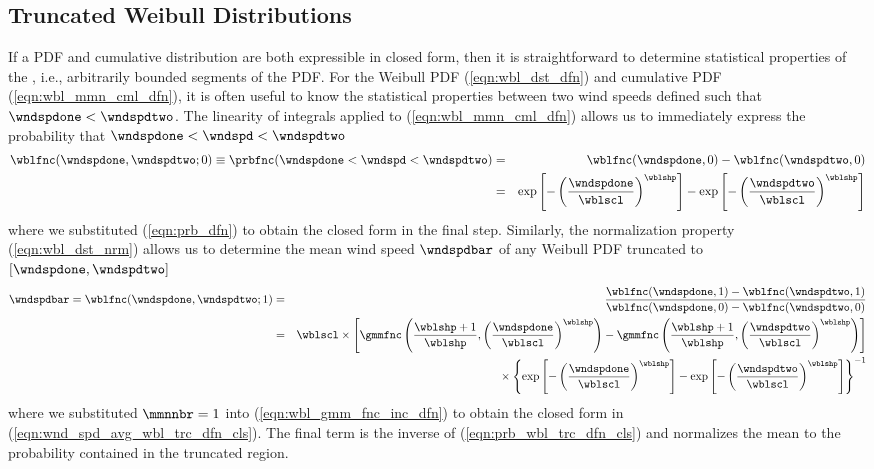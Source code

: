 \documentclass[12pt,twoside]{book}
\begin{document}
\subsection{Truncated Weibull Distributions}\label{sxn:wbl_trc}
If a PDF and cumulative distribution are both expressible in closed
form, then it is straightforward to determine statistical properties
of the , i.e., arbitrarily bounded segments of
the PDF. 
For the Weibull PDF (\ref{eqn:wbl_dst_dfn}) and cumulative PDF
(\ref{eqn:wbl_mmn_cml_dfn}), it is often useful to know the
statistical properties between two wind speeds defined such that
$\wndspdone < \wndspdtwo$. 
The linearity of integrals applied to (\ref{eqn:wbl_mmn_cml_dfn})
allows us to immediately express the probability that 
$\wndspdone < \wndspd < \wndspdtwo$
\begin{eqnarray}
\label{eqn:prb_wbl_trc_dfn}
\wblfnc(\wndspdone,\wndspdtwo;0) \equiv 
\prbfnc(\wndspdone < \wndspd < \wndspdtwo) 
& = & 
\wblfnc(\wndspdone,0) - \wblfnc(\wndspdtwo,0) \\
& = & 
\exp \left[- \left( \frac{\wndspdone}{\wblscl} \right)^{\wblshp} \right] -
\exp \left[- \left( \frac{\wndspdtwo}{\wblscl} \right)^{\wblshp} \right]
\label{eqn:prb_wbl_trc_dfn_cls}
\end{eqnarray}
where we substituted (\ref{eqn:prb_dfn}) to obtain the closed form in 
the final step.
Similarly, the normalization property (\ref{eqn:wbl_dst_nrm}) allows
us to determine the mean wind speed $\wndspdbar$ of any Weibull PDF
truncated to $[\wndspdone,\wndspdtwo]$ 
\begin{eqnarray}
\label{eqn:wnd_spd_avg_wbl_trc_dfn}
\wndspdbar = \wblfnc(\wndspdone,\wndspdtwo;1) 
& = & 
\frac{\wblfnc(\wndspdone,1) - \wblfnc(\wndspdtwo,1)}
{\wblfnc(\wndspdone,0) - \wblfnc(\wndspdtwo,0)} \\
& = & 
\wblscl \times 
\left[
\gmmfnc \left( \frac{\wblshp + 1}{\wblshp}, \left( \frac{\wndspdone}{\wblscl} \right)^{\wblshp} \right) 
-
\gmmfnc \left( \frac{\wblshp + 1}{\wblshp}, \left( \frac{\wndspdtwo}{\wblscl} \right)^{\wblshp} \right) 
\right]
\nonumber \\ & & {} %
\times
\left\{ \exp \left[- \left( \frac{\wndspdone}{\wblscl} \right)^{\wblshp} \right] -
\exp \left[- \left( \frac{\wndspdtwo}{\wblscl} \right)^{\wblshp} \right] \right\}^{-1}
\label{eqn:wnd_spd_avg_wbl_trc_dfn_cls}
\end{eqnarray}
where we substituted $\mmnnbr = 1$ into (\ref{eqn:wbl_gmm_fnc_inc_dfn})
to obtain the closed form in (\ref{eqn:wnd_spd_avg_wbl_trc_dfn_cls}). 
The final term is the inverse of (\ref{eqn:prb_wbl_trc_dfn_cls}) and 
normalizes the mean to the probability contained in the truncated
region.  
\end{document}
